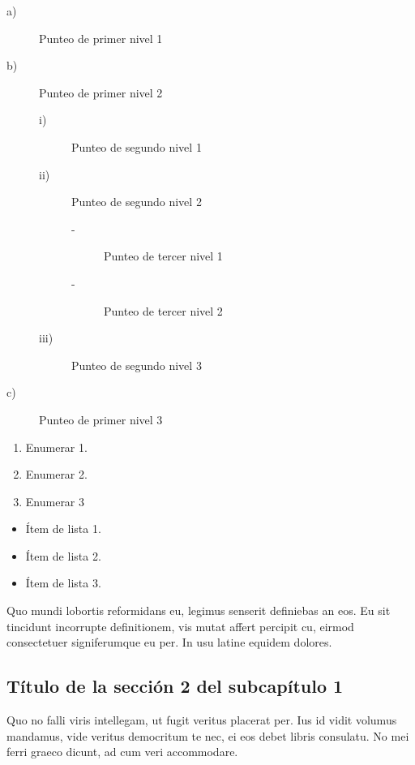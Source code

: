 \begin{description}
\item[a)] Punteo de primer nivel 1
\item[b)] Punteo de primer nivel 2

  	\begin{description}
  	\item[i)] Punteo de segundo nivel 1
  	\item[ii)] Punteo de segundo nivel 2
  
  		\begin{description}
  		\item[-] Punteo de tercer nivel 1
  		\item[-] Punteo de tercer nivel 2
		\end{description}  
		
  	\item[iii)] Punteo de segundo nivel 3
	\end{description}

\item[c)] Punteo de primer nivel 3
\end{description}

\begin{enumerate}
\item Enumerar 1.
\item Enumerar 2.
\item Enumerar 3
\end{enumerate}

\begin{itemize}
\item Ítem de lista 1.
\item Ítem de lista 2.
\item Ítem de lista 3.
\end{itemize}


\vspace{0.5cm}
\parindent=30pt Quo mundi lobortis reformidans eu, legimus senserit definiebas an eos. Eu sit tincidunt incorrupte definitionem, vis mutat affert percipit cu, eirmod consectetuer signiferumque eu per. In usu latine equidem dolores.

\subsection{Título de la sección 2 del subcapítulo 1}\label{chsub:Título de la sección 2 del subcapítulo 1}

\parindent=0pt Quo no falli viris intellegam, ut fugit veritus placerat per. Ius id vidit volumus mandamus, vide veritus democritum te nec, ei eos debet libris consulatu. No mei ferri graeco dicunt, ad cum veri accommodare. 
 


